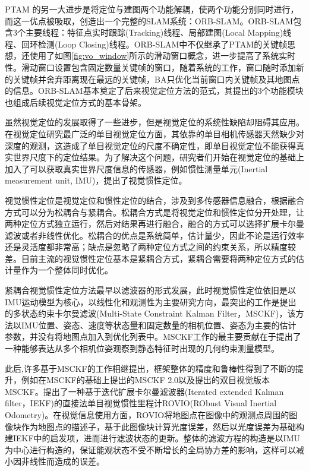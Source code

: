 PTAM 的另一大进步是将定位与建图两个功能解耦，使两个功能分别同时进行，而这一优点被\citet{mur2015orb,mur2017orb}吸取，创造出一个完整的SLAM系统：ORB-SLAM。ORB-SLAM包含3个主要线程：特征点实时跟踪(Tracking)线程、局部建图(Local Mapping)线程、回环检测(Loop Closing)线程。ORB-SLAM中不仅继承了PTAM的关键帧思想，还使用了如图\ref{fig:vo_window}所示的滑动窗口概念，进一步提高了系统实时性。滑动窗口设置包含固定数量关键帧的窗口，随着系统的工作，窗口随时添加新的关键帧并舍弃距离现在最远的关键帧，BA只优化当前窗口内关键帧及其地图点的信息。ORB-SLAM基本奠定了后来视觉定位方法的范式，其提出的3个功能模块也组成后续视觉定位方式的基本骨架。

虽然视觉定位的发展取得了一些进步，但是视觉定位的系统性缺陷却阻碍其应用。在视觉定位研究最广泛的单目视觉定位方面，其依靠的单目相机传感器天然缺少对深度的观测，这造成了单目视觉定位的尺度不确定性，即单目视觉定位不能获得真实世界尺度下的定位结果。为了解决这个问题，研究者们开始在视觉定位的基础上加入了可以获取真实世界尺度信息的传感器，例如惯性测量单元(Inertial measurement unit, IMU)，提出了视觉惯性定位。

视觉惯性定位是视觉定位和惯性定位的结合，涉及到多传感器信息融合，根据融合方式可以分为松耦合\cite{lynen2013robust}与紧耦合\cite{falquez2016inertial}。松耦合方式是将视觉定位和惯性定位分开处理，让两种定位方式独立运行，然后对结果再进行融合，融合的方式可以选择扩展卡尔曼滤波或者非线性优化。松耦合的优点是系统简单，估计量少，因此不论是运行效率还是灵活度都非常高；缺点是忽略了两种定位方式之间的约束关系，所以精度较差。目前主流的视觉惯性定位基本是紧耦合方式，紧耦合需要将两种定位方式的估计量作为一个整体同时优化。

紧耦合视觉惯性定位方法最早以滤波器的形式发展，此时视觉惯性定位依旧是以IMU运动模型为核心，以线性化和观测性为主要研究方向，最突出的工作是\citet{mourikis2007multi}提出的多状态约束卡尔曼滤波(Multi-State Constraint Kalman Filter，MSCKF)，该方法以IMU位置、姿态、速度等状态量和固定数量的相机位置、姿态为主要的估计参数，并没有将地图点加入到优化列表中。MSCKF工作的最主要贡献在于提出了一种能够表达从多个相机位姿观察到静态特征时出现的几何约束测量模型。

此后,许多基于MSCKF的工作相继提出，框架整体的精度和鲁棒性得到了不断的提升，例如\citet{li2013high}在MSCKF的基础上提出的MSCKF 2.0以及\citet{sun2018robust}提出的双目视觉版本MSCKF。\citet{bloesch2017iterated}提出了一种基于迭代扩展卡尔曼滤波器(Iterated extended Kalman filter，IEKF)的直接法单目视觉惯性里程计ROVIO(RObust Visual Inertial Odometry)。在视觉信息使用方面，ROVIO将地图点在图像中的观测点周围的图像块作为地图点的描述子，基于此图像块计算光度误差，然后以光度误差为基础构建IEKF中的启发项，进而进行滤波状态的更新。整体的滤波方程的构造是以IMU为中心进行构造的，保证能观状态不受不断增长的全局协方差的影响，这样可以减小因非线性而造成的误差。

